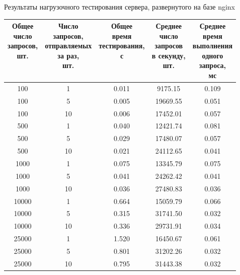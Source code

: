 \begin{center}
	\begin{threeparttable}
			\captionsetup{justification=raggedright,singlelinecheck=off}
			\caption{\label{tbl_nginx}Результаты нагрузочного тестирования сервера, развернутого на базе nginx}
			\centering
			\begin{tabular}{|c|c|c|c|c|}
				\hline
				\specialcell{Общее\\число\\запросов,\\шт.} & \specialcell{Число\\запросов,\\отправляемых\\за раз,\\шт.} & \specialcell{Общее\\время\\тестирования,\\с} & \specialcell{Среднее\\число\\запросов\\в секунду,\\шт.} & \specialcell{Среднее\\время\\выполнения\\одного\\запроса,\\мс} \\
				\hline
				100 & 1 & 0.011 & 9175.15 & 0.109 \\
				\hline
				100 & 5 & 0.005 & 19669.55 & 0.051 \\
				\hline
				100 & 10 & 0.006 & 17452.01 & 0.057 \\
				\hline
				500 & 1 & 0.040 & 12421.74 & 0.081 \\
				\hline
				500 & 5 & 0.029 & 17480.07 & 0.057 \\
				\hline
				500 & 10 & 0.021 & 24112.65 & 0.041 \\
				\hline
				1000 & 1 & 0.075 & 13345.79 & 0.075 \\
				\hline
				1000 & 5 & 0.041 & 24262.42 & 0.041 \\
				\hline
				1000 & 10 & 0.036 & 27480.83 & 0.036 \\
				\hline
				10000 & 1 & 0.664 & 15059.79 & 0.066 \\
				\hline
				10000 & 5 & 0.315 & 31741.50 & 0.032 \\
				\hline
				10000 & 10 & 0.336 & 29731.91 & 0.034 \\
				\hline
				25000 & 1 & 1.520 & 16450.67 & 0.061 \\
				\hline
				25000 & 5 & 0.801 & 31202.26 & 0.032 \\
				\hline
				25000 & 10 & 0.795 & 31443.38 & 0.032 \\
				\hline
			\end{tabular}
		\end{threeparttable}
\end{center}
